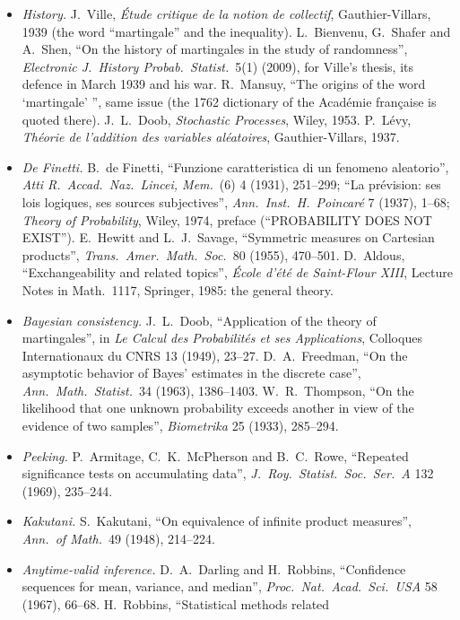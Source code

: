 \begin{itemize}
\item \emph{History.} J.~Ville, \emph{\'Etude critique de la notion de collectif}, Gauthier-Villars, 1939 (the word ``martingale'' and the inequality). L.~Bienvenu, G.~Shafer and A.~Shen, ``On the history of martingales in
the study of randomness'', \emph{Electronic J.\ History Probab.\ Statist.}\ 5(1) (2009), for Ville's thesis, its defence in March 1939 and his war. R.~Mansuy, ``The origins of the word `martingale' '', same issue
(the 1762 dictionary of the Acad\'emie fran\c caise is quoted there). J.~L.~Doob, \emph{Stochastic Processes}, Wiley, 1953. P.~L\'evy, \emph{Th\'eorie de l'addition des variables al\'eatoires}, Gauthier-Villars, 1937.
\item \emph{De Finetti.} B.~de Finetti, ``Funzione caratteristica di un fenomeno aleatorio'', \emph{Atti R.\ Accad.\ Naz.\ Lincei, Mem.}\ (6) 4 (1931), 251--299; ``La pr\'evision: ses lois logiques, ses sources
subjectives'', \emph{Ann.\ Inst.\ H.\ Poincar\'e} 7 (1937), 1--68; \emph{Theory of Probability}, Wiley, 1974, preface (``PROBABILITY DOES NOT EXIST''). E.~Hewitt and L.~J.~Savage, ``Symmetric measures on Cartesian
products'', \emph{Trans.\ Amer.\ Math.\ Soc.}\ 80 (1955), 470--501. D.~Aldous, ``Exchangeability and related topics'', \emph{\'Ecole d'\'et\'e de Saint-Flour XIII}, Lecture Notes in Math.\ 1117, Springer, 1985: the
general theory.
\item \emph{Bayesian consistency.} J.~L.~Doob, ``Application of the theory of martingales'', in \emph{Le Calcul des Probabilit\'es et ses Applications}, Colloques Internationaux du CNRS 13 (1949), 23--27.
D.~A.~Freedman, ``On the asymptotic behavior of Bayes' estimates in the discrete case'', \emph{Ann.\ Math.\ Statist.}\ 34 (1963), 1386--1403. W.~R.~Thompson, ``On the likelihood that one unknown probability
exceeds another in view of the evidence of two samples'', \emph{Biometrika} 25 (1933), 285--294.
\item \emph{Peeking.} P.~Armitage, C.~K.~McPherson and B.~C.~Rowe, ``Repeated significance tests on accumulating data'', \emph{J.\ Roy.\ Statist.\ Soc.\ Ser.~A} 132 (1969), 235--244.
\item \emph{Kakutani.} S.~Kakutani, ``On equivalence of infinite product measures'', \emph{Ann.\ of Math.}\ 49 (1948), 214--224.
\item \emph{Anytime-valid inference.} D.~A.~Darling and H.~Robbins, ``Confidence sequences for mean, variance, and median'', \emph{Proc.\ Nat.\ Acad.\ Sci.\ USA} 58 (1967), 66--68. H.~Robbins, ``Statistical methods related

\end{itemize}
